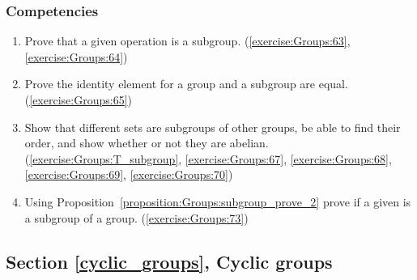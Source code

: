\subsubsection*{Competencies}
\begin{enumerate}
\item
Prove that a given operation is a subgroup. (\ref{exercise:Groups:63}, \ref{exercise:Groups:64})

\item
Prove the identity element for a group and a subgroup are equal.  (\ref{exercise:Groups:65})

\item
Show that different sets are subgroups of other groups, be able to find their order, and show whether or not they are abelian. (\ref{exercise:Groups:T_subgroup}, \ref{exercise:Groups:67}, \ref{exercise:Groups:68}, \ref{exercise:Groups:69}, \ref{exercise:Groups:70})

\item
Using Proposition~\ref{proposition:Groups:subgroup_prove_2} prove if a given is a subgroup of a group. (\ref{exercise:Groups:73})
\end{enumerate}


\subsection*{Section \ref{cyclic_groups}, Cyclic groups}
